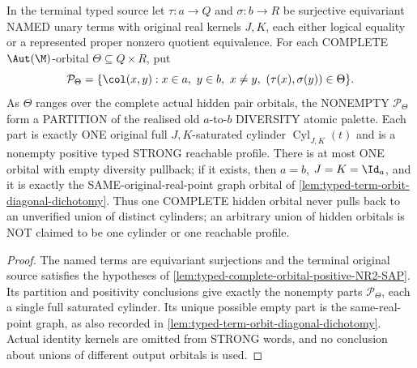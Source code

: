 \begin{corollary}
\label{cor:typed-complete-orbital-pullback-partition}
In the terminal typed source let
$\tau:a\to Q$ and $\sigma:b\to R$
be surjective equivariant NAMED unary terms
with original real kernels $J,K$,
each either logical equality or a represented
proper nonzero quotient equivalence.
For each COMPLETE $\Aut(\M)$-orbital
$\Theta\subseteq Q\times R$, put
\[
 \mathcal P_\Theta=
 \{\col(x,y):x\in a,\ y\in b,\ x\ne y,\
       (\tau(x),\sigma(y))\in\Theta\}.
\]
As $\Theta$ ranges over the complete actual hidden
pair orbitals, the NONEMPTY $\mathcal P_\Theta$
form a PARTITION of the realised old
$a$-to-$b$ DIVERSITY atomic palette.
Each part is exactly ONE original full
$J,K$-saturated cylinder
$\operatorname{Cyl}_{J,K}(t)$ and is
a nonempty positive typed STRONG reachable profile.
There is at most ONE orbital with empty
diversity pullback; if it exists, then
$a=b$, $J=K=\Id_a$, and it is exactly
the SAME-original-real-point graph orbital
of \cref{lem:typed-term-orbit-diagonal-dichotomy}.
Thus one COMPLETE hidden orbital never pulls
back to an unverified union of distinct cylinders;
an arbitrary union of hidden orbitals is NOT
claimed to be one cylinder or one reachable profile.
\end{corollary}
\begin{proof}
The named terms are equivariant surjections and the terminal original
source satisfies the hypotheses of
\cref{lem:typed-complete-orbital-positive-NR2-SAP}. Its partition and
positivity conclusions give exactly the nonempty parts
$\mathcal P_\Theta$, each a single full saturated cylinder. Its unique
possible empty part is the same-real-point graph, as also recorded in
\cref{lem:typed-term-orbit-diagonal-dichotomy}. Actual identity kernels
are omitted from STRONG words, and no conclusion about unions of
different output orbitals is used.
\end{proof}

